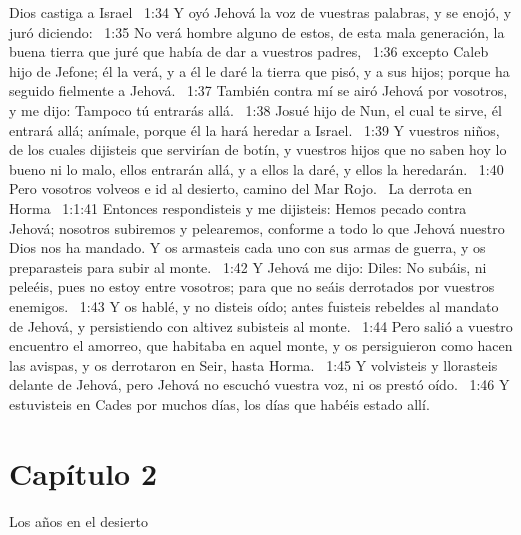 Dios castiga a Israel   
1:34 Y oyó Jehová la voz de vuestras palabras, y se enojó, y juró diciendo:  
1:35 No verá hombre alguno de estos, de esta mala generación, la buena tierra que juré que había de dar a vuestros padres,  
1:36 excepto Caleb hijo de Jefone; él la verá, y a él le daré la tierra que pisó, y a sus hijos; porque ha seguido fielmente a Jehová.  
1:37 También contra mí se airó Jehová por vosotros, y me dijo: Tampoco tú entrarás allá.  
1:38 Josué hijo de Nun, el cual te sirve, él entrará allá; anímale, porque él la hará heredar a Israel.  
1:39 Y vuestros niños, de los cuales dijisteis que servirían de botín, y vuestros hijos que no saben hoy lo bueno ni lo malo, ellos entrarán allá, y a ellos la daré, y ellos la heredarán.  
1:40 Pero vosotros volveos e id al desierto, camino del Mar Rojo.  
La derrota en Horma   
1:1:41 Entonces respondisteis y me dijisteis: Hemos pecado contra Jehová; nosotros subiremos y pelearemos, conforme a todo lo que Jehová nuestro Dios nos ha mandado. Y os armasteis cada uno con sus armas de guerra, y os preparasteis para subir al monte.  
1:42 Y Jehová me dijo: Diles: No subáis, ni peleéis, pues no estoy entre vosotros; para que no seáis derrotados por vuestros enemigos.  
1:43 Y os hablé, y no disteis oído; antes fuisteis rebeldes al mandato de Jehová, y persistiendo con altivez subisteis al monte.  
1:44 Pero salió a vuestro encuentro el amorreo, que habitaba en aquel monte, y os persiguieron como hacen las avispas, y os derrotaron en Seir, hasta Horma.  
1:45 Y volvisteis y llorasteis delante de Jehová, pero Jehová no escuchó vuestra voz, ni os prestó oído.  
1:46 Y estuvisteis en Cades por muchos días, los días que habéis estado allí.  
\section*{Capítulo 2}
Los años en el desierto  

